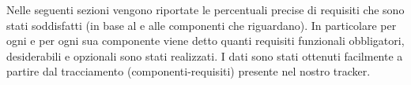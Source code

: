 

















				Nelle seguenti sezioni vengono riportate le percentuali precise di requisiti che sono stati soddisfatti (in base al  e alle componenti che riguardano). In particolare per ogni  e per ogni sua componente viene detto quanti requisiti funzionali obbligatori, desiderabili e opzionali sono stati realizzati. I dati sono stati ottenuti facilmente a partire dal tracciamento (componenti-requisiti) presente nel nostro tracker.

